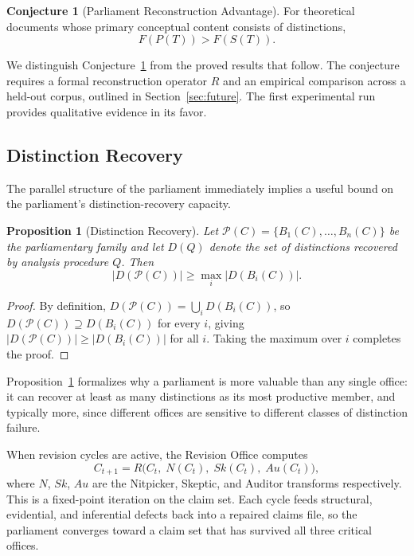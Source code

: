 \documentclass[12pt, a4paper]{article}
\newtheorem{proposition}{Proposition}[section]
\theoremstyle{principle}
\theoremstyle{definition}
\newtheorem{conjecture}{Conjecture}[section]
\begin{document}
\begin{conjecture}[Parliament Reconstruction Advantage]
\label{conj:reconstruction}
For theoretical documents whose primary conceptual content consists of distinctions,
\[
F(P(T)) > F(S(T)).
\]
\end{conjecture}

We distinguish Conjecture~\ref{conj:reconstruction} from the proved results that
follow. The conjecture requires a formal reconstruction operator $R$ and an empirical
comparison across a held-out corpus, outlined in Section~\ref{sec:future}. The first
experimental run provides qualitative evidence in its favor.

\subsection{Distinction Recovery}

The parallel structure of the parliament immediately implies a useful bound on
the parliament's distinction-recovery capacity.

\begin{proposition}[Distinction Recovery]
\label{prop:recovery}
Let $\mathcal{P}(C) = \{B_1(C), \ldots, B_n(C)\}$ be the parliamentary family and
let $D(Q)$ denote the set of distinctions recovered by analysis procedure $Q$.
Then
\[
|D(\mathcal{P}(C))| \geq \max_i |D(B_i(C))|.
\]
\end{proposition}

\begin{proof}
By definition, $D(\mathcal{P}(C)) = \bigcup_i D(B_i(C))$, so
$D(\mathcal{P}(C)) \supseteq D(B_i(C))$ for every $i$, giving
$|D(\mathcal{P}(C))| \geq |D(B_i(C))|$ for all $i$.
Taking the maximum over $i$ completes the proof.
\end{proof}

Proposition~\ref{prop:recovery} formalizes why a parliament is more valuable than
any single office: it can recover at least as many distinctions as its most
productive member, and typically more, since different offices are sensitive to
different classes of distinction failure.

When revision cycles are active, the Revision Office computes
\[
C_{t+1} = R\bigl(C_t,\; N(C_t),\; Sk(C_t),\; Au(C_t)\bigr),
\]
where $N$, $Sk$, $Au$ are the Nitpicker, Skeptic, and Auditor transforms
respectively. This is a fixed-point iteration on the claim set. Each cycle feeds
structural, evidential, and inferential defects back into a repaired claims file,
so the parliament converges toward a claim set that has survived all three
critical offices.
\end{document}
